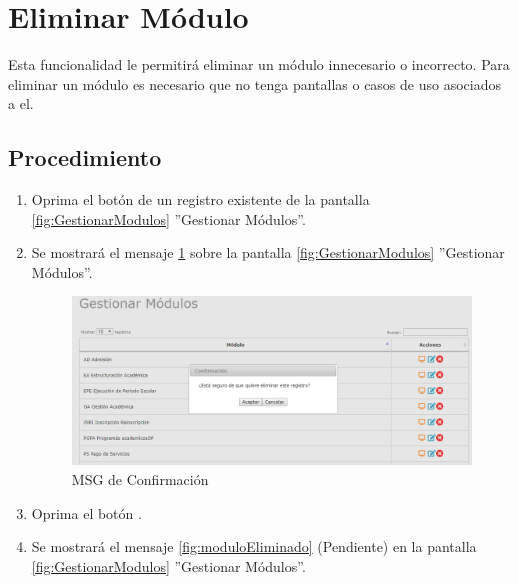 \hypertarget{cv:eliminarModulo}{\section{Eliminar Módulo}} \label{sec:eliminarModulo}

	Esta funcionalidad le permitirá eliminar un módulo innecesario o incorrecto. Para eliminar un módulo es necesario que no tenga pantallas o casos de uso asociados a el.

		\subsection{Procedimiento}

			\begin{enumerate}
	
			\item Oprima el botón \IUBotonEliminar{} de un registro existente de la pantalla \ref{fig:GestionarModulos} ''Gestionar Módulos''.
	
			\item Se mostrará el mensaje \ref{fig:confirmaEliminaModulo} sobre la pantalla \ref{fig:GestionarModulos} ''Gestionar Módulos''.
			
			\begin{figure}[htbp!]
				\begin{center}
					\includegraphics[scale=0.6]{roles/lider/modulos/pantallas/IU5-3MSG10}
					\caption{MSG de Confirmación}
					\label{fig:confirmaEliminaModulo}
				\end{center}
			\end{figure}
						
			\item Oprima el botón \IUAceptar.
			
			\item Se mostrará el mensaje \ref{fig:moduloEliminado}  (Pendiente) en la pantalla \ref{fig:GestionarModulos} ''Gestionar Módulos''.
			

\end{enumerate}
